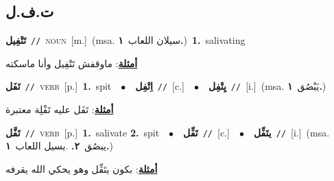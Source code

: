 \documentclass[10pt,a4paper,twoside]{article} %
\begin{document}
\begin{multicols}{2}
\vspace{-3mm}
\subsection*{\color{blue}\foreignlanguage{arabic}{ت.ف.ل}\color{blue}{}} 

{\setlength\topsep{0pt}\textbf{\foreignlanguage{arabic}{تَتْفِيل}}\ {\color{gray}\texttt{//}\color{black}}\ \textsc{noun}\ [m.]\ \color{gray}(msa. \foreignlanguage{arabic}{سيلان اللعاب}~\foreignlanguage{arabic}{\textbf{١.}})\color{black}\ \textbf{1.}~salivating\  \begin{flushright}\color{gray}\foreignlanguage{arabic}{\textbf{\underline{\foreignlanguage{arabic}{أمثلة}}}: ماوقفش تَتْفِيل وأنا ماسكته}\end{flushright}\color{black}} \vspace{2mm}

{\setlength\topsep{0pt}\textbf{\foreignlanguage{arabic}{تَفَل}}\ {\color{gray}\texttt{//}\color{black}}\ \textsc{verb}\ [p.]\ \textbf{1.}~spit\ \ $\bullet$\ \ \setlength\topsep{0pt}\textbf{\foreignlanguage{arabic}{اِتْفِل}}\ {\color{gray}\texttt{//}\color{black}}\ [c.]\ \ $\bullet$\ \ \setlength\topsep{0pt}\textbf{\foreignlanguage{arabic}{يِتْفِل}}\ {\color{gray}\texttt{//}\color{black}}\ [i.]\ \color{gray}(msa. \foreignlanguage{arabic}{يَبْصُق}~\foreignlanguage{arabic}{\textbf{١.}})\color{black}\  \begin{flushright}\color{gray}\foreignlanguage{arabic}{\textbf{\underline{\foreignlanguage{arabic}{أمثلة}}}: تَفَل عليه تَفْلِة معتبرة}\end{flushright}\color{black}} \vspace{2mm}

{\setlength\topsep{0pt}\textbf{\foreignlanguage{arabic}{تَفَّل}}\ {\color{gray}\texttt{//}\color{black}}\ \textsc{verb}\ [p.]\ \textbf{1.}~salivate  \textbf{2.}~spit\ \ $\bullet$\ \ \setlength\topsep{0pt}\textbf{\foreignlanguage{arabic}{تَفِّل}}\ {\color{gray}\texttt{//}\color{black}}\ [c.]\ \ $\bullet$\ \ \setlength\topsep{0pt}\textbf{\foreignlanguage{arabic}{يتَفِّل}}\ {\color{gray}\texttt{//}\color{black}}\ [i.]\ \color{gray}(msa. \foreignlanguage{arabic}{يبصُق}~\foreignlanguage{arabic}{\textbf{٢.}}  .\foreignlanguage{arabic}{يسيل اللعاب}~\foreignlanguage{arabic}{\textbf{١.}})\color{black}\  \begin{flushright}\color{gray}\foreignlanguage{arabic}{\textbf{\underline{\foreignlanguage{arabic}{أمثلة}}}: بكون يتَفِّل وهو يحكي الله يقرفه}\end{flushright}\color{black}} \vspace{2mm}


\end{multicols}
\end{document}
